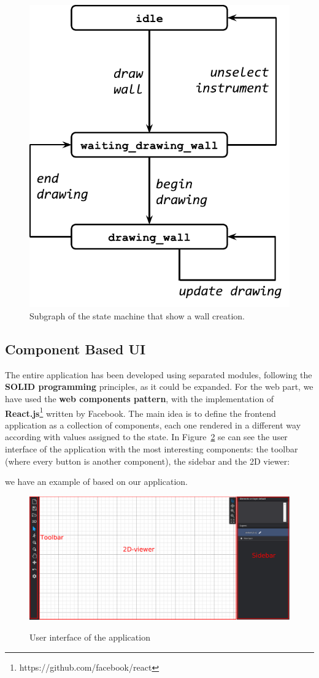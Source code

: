 \begin{figure}[!t]
\centering
\includegraphics[width=0.6\linewidth]{contents/images/uc_draw_wall}

\caption{Subgraph of the state machine that show a wall creation.}
\label{fig_uc_draw_wall}
\end{figure}

\subsection{Component Based UI}


The entire application has been developed using separated modules, following the \textbf{SOLID programming} principles, as it could be expanded. For the web part, we have used the \textbf{web components pattern}, with the implementation of \textbf{React.js}\footnote{https://github.com/facebook/react} written by Facebook. The main idea is to define the frontend application as a collection of components, each one rendered in a different way according with values assigned to the state. In Figure~\ref{fig_ui} se can see the user interface of the application with the most interesting components: the toolbar (where every button is another component), the sidebar and the 2D viewer:

we have an example of based on our application.\\

\begin{figure}[h]
\centering
\includegraphics[width=\linewidth]{contents/images/ui}\\
\caption{User interface of the application}
\label{fig_ui}
\end{figure}

